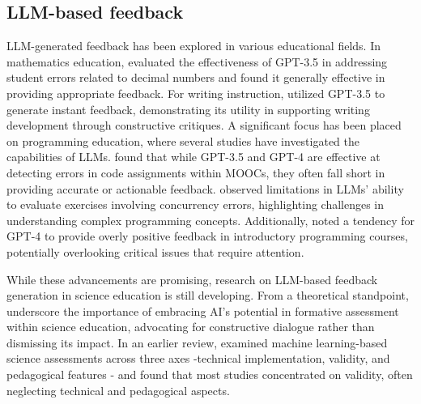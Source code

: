


\subsection{LLM-based feedback}



LLM-generated feedback has been explored in various educational fields. In mathematics education, \citet{nguyen2023evaluating} evaluated the effectiveness of GPT-3.5 in addressing student errors related to decimal numbers and found it generally effective in providing appropriate feedback. For writing instruction, \citet{sessler2023peer} utilized GPT-3.5 to generate instant feedback, demonstrating its utility in supporting writing development through constructive critiques. A significant focus has been placed on programming education, where several studies have investigated the capabilities of LLMs. \citet{gabbay2024combining} found that while GPT-3.5 and GPT-4 are effective at detecting errors in code assignments within MOOCs, they often fall short in providing accurate or actionable feedback. \citet{estevez2024evaluation} observed limitations in LLMs' ability to evaluate exercises involving concurrency errors, highlighting challenges in understanding complex programming concepts. Additionally, \citet{koutcheme2024open} noted a tendency for GPT-4 to provide overly positive feedback in introductory programming courses, potentially overlooking critical issues that require attention.

While these advancements are promising, research on LLM-based feedback generation in science education is still developing. From a theoretical standpoint, \citet{zhai2023ai} underscore the importance of embracing AI's potential in formative assessment within science education, advocating for constructive dialogue rather than dismissing its impact. In an earlier review, \citet{zhai2020applying} examined machine learning-based science assessments across three axes -technical implementation, validity, and pedagogical features - and found that most studies concentrated on validity, often neglecting technical and pedagogical aspects.

